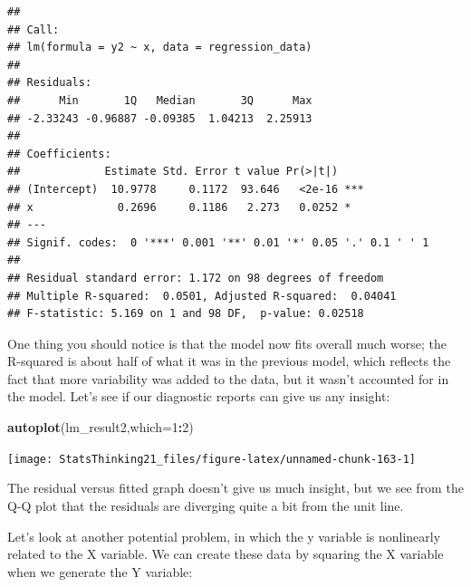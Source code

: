 \documentclass[12pt,]{book}
\newenvironment{Shaded}{\begin{snugshade}}{\end{snugshade}}
\newcommand{\DataTypeTok}[1]{\textcolor[rgb]{0.13,0.29,0.53}{#1}}
\newcommand{\DecValTok}[1]{\textcolor[rgb]{0.00,0.00,0.81}{#1}}
\newcommand{\KeywordTok}[1]{\textcolor[rgb]{0.13,0.29,0.53}{\textbf{#1}}}
\newcommand{\NormalTok}[1]{#1}
\newcommand{\OperatorTok}[1]{\textcolor[rgb]{0.81,0.36,0.00}{\textbf{#1}}}
\newcommand{\StringTok}[1]{\textcolor[rgb]{0.31,0.60,0.02}{#1}}
\begin{document}
\begin{verbatim}
## 
## Call:
## lm(formula = y2 ~ x, data = regression_data)
## 
## Residuals:
##      Min       1Q   Median       3Q      Max 
## -2.33243 -0.96887 -0.09385  1.04213  2.25913 
## 
## Coefficients:
##             Estimate Std. Error t value Pr(>|t|)    
## (Intercept)  10.9778     0.1172  93.646   <2e-16 ***
## x             0.2696     0.1186   2.273   0.0252 *  
## ---
## Signif. codes:  0 '***' 0.001 '**' 0.01 '*' 0.05 '.' 0.1 ' ' 1
## 
## Residual standard error: 1.172 on 98 degrees of freedom
## Multiple R-squared:  0.0501, Adjusted R-squared:  0.04041 
## F-statistic: 5.169 on 1 and 98 DF,  p-value: 0.02518
\end{verbatim}

One thing you should notice is that the model now fits overall much worse; the R-squared is about half of what it was in the previous model, which reflects the fact that more variability was added to the data, but it wasn't accounted for in the model. Let's see if our diagnostic reports can give us any insight:

\begin{Shaded}
\begin{Highlighting}[]
\KeywordTok{autoplot}\NormalTok{(lm_result2,}\DataTypeTok{which=}\DecValTok{1}\OperatorTok{:}\DecValTok{2}\NormalTok{)}
\end{Highlighting}
\end{Shaded}

\texttt{[image: StatsThinking21\_files/figure-latex/unnamed-chunk-163-1]}

The residual versus fitted graph doesn't give us much insight, but we see from the Q-Q plot that the residuals are diverging quite a bit from the unit line.

Let's look at another potential problem, in which the y variable is nonlinearly related to the X variable. We can create these data by squaring the X variable when we generate the Y variable:

\begin{Shaded}
\end{Shaded}
\end{document}
